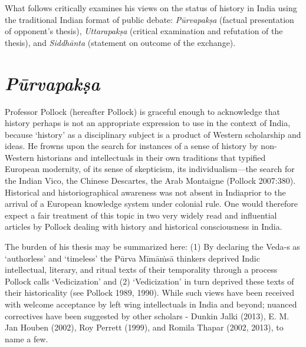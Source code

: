 What follows critically examines his views on the status of history in India using the traditional Indian format of public debate: \textit{Pūrvapakṣa} (factual presentation of opponent’s thesis), \textit{Uttarapakṣa} (critical examination and refutation of the thesis), and \textit{Siddhānta} (statement on outcome of the exchange).


\section*{\textit{Pūrvapakṣa}}

Professor Pollock (hereafter Pollock) is graceful enough to acknowledge that history perhaps is not an appropriate expression to use in the context of India, because ‘history’ as a disciplinary subject is a product of Western scholarship and ideas. He frowns upon the search for instances of a sense of history by non-Western historians and intellectuals in their own traditions that typified European modernity, of its sense of skepticism, its individualism—the search for the Indian Vico, the Chinese Descartes, the Arab Montaigne (Pollock 2007:380). Historical and historiographical awareness was not absent in India\break prior to the arrival of a European knowledge system under colonial rule. One would therefore expect a fair treatment of this topic in two very widely read and influential articles by Pollock dealing with history and historical consciousness in India.

The burden of his thesis may be summarized here: (1) By declaring the Veda-s as ‘authorless’ and ‘timeless’ the Pūrva Mīmāṁsā thinkers deprived Indic intellectual, literary, and ritual texts of their temporality through a process Pollock calls ‘Vedicization’ and (2) ‘Vedicization’ in turn deprived these texts of their historicality (see Pollock 1989, 1990). While such views have been received with welcome acceptance by left wing intellectuals in India and beyond; nuanced correctives have been suggested by other scholars - Dunkin Jalki (2013), E. M. Jan Houben (2002), Roy Perrett (1999), and Romila Thapar (2002, 2013), to name a few.

